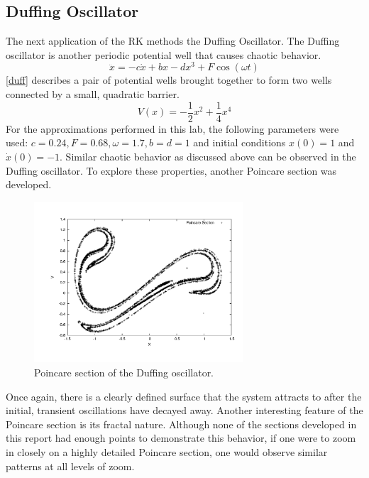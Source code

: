 \documentclass[12pt]{article}
\begin{document}
\subsection{Duffing Oscillator}
The next application of the RK methods the Duffing Oscillator.  The Duffing oscillator is another periodic potential well that causes chaotic behavior.  
\begin{equation}
\label{duff}
\ddot{x} = -c\dot{x}+bx-dx^3+F\cos{(\omega t)} 
\end{equation}
\eqref{duff} describes a pair of potential wells brought together to form two wells connected by a small, quadratic barrier.
\begin{equation}
\label{duffV}
V(x)=-\frac{1}{2}x^2+\frac{1}{4}x^4
\end{equation}
For the approximations performed in this lab, the following parameters were used:  $c=0.24, F=0.68, \omega = 1.7, b=d=1$ and initial conditions $x(0) = 1$ and $\dot{x}(0)=-1$.  Similar chaotic behavior as discussed above can be observed in the Duffing oscillator.  To explore these properties, another Poincare section was developed.
\begin{figure}[!h]
\centering
\includegraphics[width =110 mm, height = 60mm]{Fig_12_12.pdf}
\caption{Poincare section of the Duffing oscillator.}
\label{fig:12_12}
\end{figure}

Once again, there is a clearly defined surface that the system attracts to after the initial, transient oscillations have decayed away.  Another interesting feature of the Poincare section is its fractal nature.  Although none of the sections developed in this report had enough points to demonstrate this behavior, if one were to zoom in closely on a highly detailed Poincare section, one would observe similar patterns at all levels of zoom.
\end{document}
